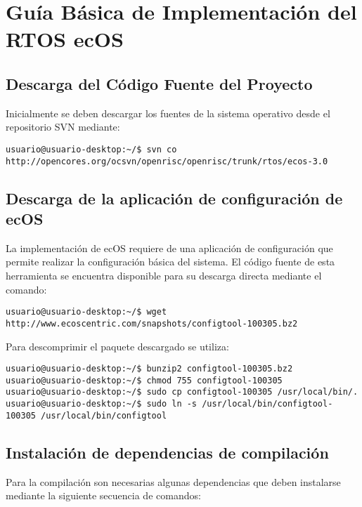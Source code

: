 \chapter{Guía Básica de Implementación del RTOS ecOS} \label{app:apendice4}

\section{Descarga del Código Fuente del Proyecto}

Inicialmente se deben descargar los fuentes de la sistema operativo desde el repositorio SVN mediante:

\begin{lstlisting}[breaklines]
 usuario@usuario-desktop:~/$ svn co http://opencores.org/ocsvn/openrisc/openrisc/trunk/rtos/ecos-3.0
\end{lstlisting}

\section{Descarga de la aplicación de configuración de ecOS}

La implementación de ecOS requiere de una aplicación de configuración que permite realizar la configuración básica del sistema. El código fuente de
esta herramienta se encuentra disponible para su descarga directa mediante el comando:

\begin{lstlisting}[breaklines]
 usuario@usuario-desktop:~/$ wget http://www.ecoscentric.com/snapshots/configtool-100305.bz2
\end{lstlisting}

Para descomprimir el paquete descargado se utiliza:

\begin{lstlisting}[breaklines]
usuario@usuario-desktop:~/$ bunzip2 configtool-100305.bz2
usuario@usuario-desktop:~/$ chmod 755 configtool-100305
usuario@usuario-desktop:~/$ sudo cp configtool-100305 /usr/local/bin/.
usuario@usuario-desktop:~/$ sudo ln -s /usr/local/bin/configtool-100305 /usr/local/bin/configtool
\end{lstlisting}

\section{Instalación de dependencias de compilación}

Para la compilación son necesarias algunas dependencias que deben instalarse mediante la siguiente secuencia de comandos:

